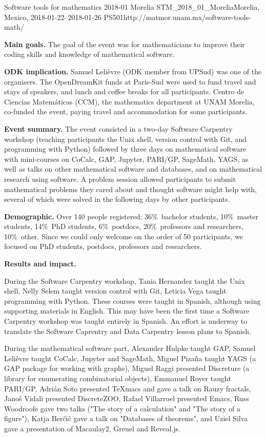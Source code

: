 \begin{event}{Software tools for mathematics 2018-01 Morelia}%
{STM_2018_01_Morelia}{Morelia, Mexico, 2018-01-22--2018-01-26}%
{PS}{50}{1}{http://matmor.unam.mx/software-tools-math/}

\textbf{Main goals.} The goal of the event was for mathematicians
to improve their coding skills and knowledge of mathematical software.

\textbf{ODK implication.} Samuel Lelièvre (ODK member from UPSud) was one of
the organisers. The OpenDreamKit funds at Paris-Sud were used to fund travel
and stays of speakers, and lunch and coffee breaks for all participants.
Centro de Ciencias Matemáticas (CCM), the mathematics department at
UNAM Morelia, co-funded the event, paying travel and accommodation for
some participants.

\textbf{Event summary.} The event consisted in a two-day Software Carpentry
workshop (teaching participants the Unix shell, version control with Git,
and programming with Python) followed by three days on mathematical software
with mini-courses on CoCalc, GAP, Jupyter, PARI/GP, SageMath, YAGS, as well
as talks on other mathematical software and databases, and on mathematical
research using software. A problem session allowed participants to submit
mathematical problems they cared about and thought software might help with,
several of which were solved in the following days by other participants.

\textbf{Demographic.} Over 140 people registered: 36\%\ bachelor students,
10\%\ master students, 14\%\ PhD students, 6\%\ postdocs, 20\%\ professors
and researchers, 10\%\ other. Since we could only welcome on the order of
50 participants, we focused on PhD students, postdocs, professors and
researchers.

\textbf{Results and impact.}

During the Software Carpentry workshop, Tania Hernandez taught the Unix shell,
Nelly Selem taught version control with Git, Leticia Vega taught programming
with Python. These courses were taught in Spanish, although using supporting
materials in English. This may have been the first time a Software Carpentry
workshop was taught entirely in Spanish. An effort is underway to translate
the Software Caprentry and Data Carpentry lesson plans to Spanish.

During the mathematical software part, Alexander Hulpke taught GAP, Samuel
Lelièvre taught CoCalc, Jupyter and SageMath, Miguel Pizaña taught YAGS
(a GAP package for working with graphs), Miguel Raggi presented Discreture
(a library for enumerating combinatorial objects), Emmanuel Royer taught
PARI/GP, Adrián Soto presented TeXmacs and gave a talk on Rauzy fractals,
Janoš Vidali presented DiscreteZOO, Rafael Villarroel presented Emacs,
Russ Woodroofe gave two talks ("The story of a calculation" and "The story
of a figure"), Katja Berčič gave a talk on "Databases of theorems", and
Uziel Silva gave a presentation of Macaulay2, Greuel and Reveal.js.


\end{event}
